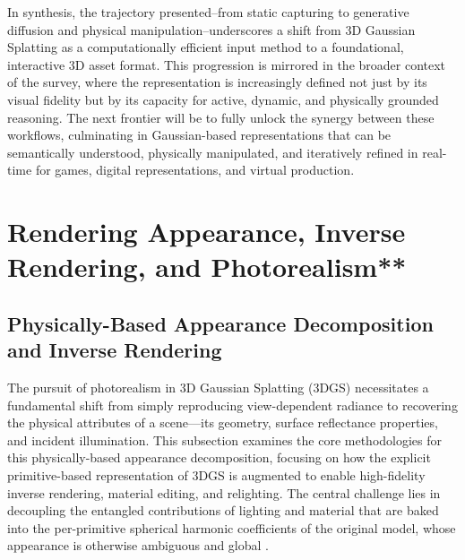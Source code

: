 \documentclass[11pt,a4paper]{article}
\begin{document}
In synthesis, the trajectory presented--from static capturing to generative diffusion and physical manipulation--underscores a shift from 3D Gaussian Splatting as a computationally efficient input method to a foundational, interactive 3D asset format. This progression is mirrored in the broader context of the survey, where the representation is increasingly defined not just by its visual fidelity but by its capacity for active, dynamic, and physically grounded reasoning. The next frontier will be to fully unlock the synergy between these workflows, culminating in Gaussian-based representations that can be semantically understood, physically manipulated, and iteratively refined in real-time for games, digital representations, and virtual production.


\section{Rendering Appearance, Inverse Rendering, and Photorealism**}



\subsection{Physically-Based Appearance Decomposition and Inverse Rendering}


The pursuit of photorealism in 3D Gaussian Splatting (3DGS) necessitates a fundamental shift from simply reproducing view-dependent radiance to recovering the physical attributes of a scene---its geometry, surface reflectance properties, and incident illumination. This subsection examines the core methodologies for this physically-based appearance decomposition, focusing on how the explicit primitive-based representation of 3DGS is augmented to enable high-fidelity inverse rendering, material editing, and relighting. The central challenge lies in decoupling the entangled contributions of lighting and material that are baked into the per-primitive spherical harmonic coefficients of the original model, whose appearance is otherwise ambiguous and global \cite{arxiv:2308.04079v1}.
\end{document}
